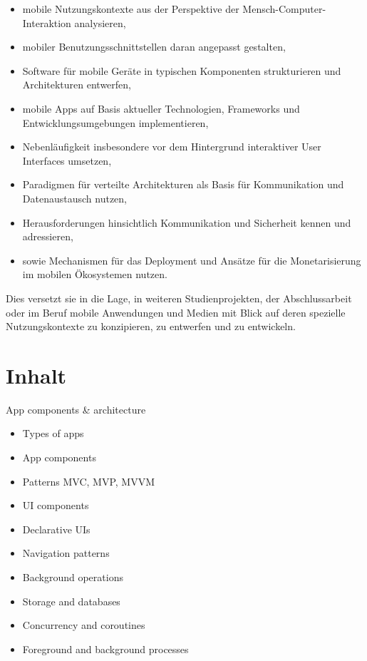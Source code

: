 \begin{itemize}
\tightlist
\item
  mobile Nutzungskontexte aus der Perspektive der
  Mensch-Computer-Interaktion analysieren,
\item
  mobiler Benutzungsschnittstellen daran angepasst gestalten,
\item
  Software für mobile Geräte in typischen Komponenten strukturieren und
  Architekturen entwerfen,
\item
  mobile Apps auf Basis aktueller Technologien, Frameworks und
  Entwicklungsumgebungen implementieren,
\item
  Nebenläufigkeit insbesondere vor dem Hintergrund interaktiver User
  Interfaces umsetzen,
\item
  Paradigmen für verteilte Architekturen als Basis für Kommunikation und
  Datenaustausch nutzen,
\item
  Herausforderungen hinsichtlich Kommunikation und Sicherheit kennen und
  adressieren,
\item
  sowie Mechanismen für das Deployment und Ansätze für die
  Monetarisierung im mobilen Ökosystemen nutzen.
\end{itemize}

Dies versetzt sie in die Lage, in weiteren Studienprojekten, der
Abschlussarbeit oder im Beruf mobile Anwendungen und Medien mit Blick
auf deren spezielle Nutzungskontexte zu konzipieren, zu entwerfen und zu
entwickeln.

\hypertarget{inhaltpathlabelmi-2017modulbeschreibungen-bachelorba_mobile-computing}{%
\section*{Inhalt\label{/mi-2017/modulbeschreibungen-bachelor/BA_Mobile-Computing}}\label{inhaltpathlabelmi-2017modulbeschreibungen-bachelorba_mobile-computing}}

App components \& architecture

\begin{itemize}
\tightlist
\item
  Types of apps
\item
  App components
\item
  Patterns MVC, MVP, MVVM
\item
  UI components
\item
  Declarative UIs
\item
  Navigation patterns
\item
  Background operations
\item
  Storage and databases
\item
  Concurrency and coroutines
\item
  Foreground and background processes
\end{itemize}

